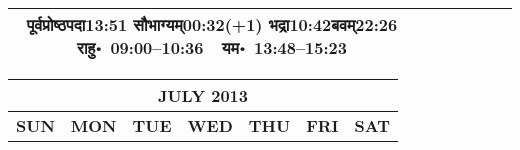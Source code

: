 \documentclass[a3paper,12pt,landscape]{article}
\newcommand{\To}{\hspace{1pt}\raisebox{0pt}{\tiny\RIGHTarrow}\hspace{1pt}}
\newcommand{\rahuyama}[2]{%
{राहु॰~\textsf{#1}~~यम॰~\textsf{#2}}
}
\begin{document}
\begin{center}
\begin{tabular}{|c|c|c|c|c|c|c|}
{{\mbox{पूर्वप्रोष्ठपदा\To{}\textsf{13:51\hspace{2ex}}}}%
{\mbox{सौभाग्यम्\To{}\textsf{00:32(+1)\hspace{2ex}}}}%
{\mbox{भद्रा\To{}\textsf{10:42\hspace{2ex}}}\mbox{बवम्\To{}\textsf{22:26\hspace{2ex}}}}}%
{\rahuyama{09:00--10:36}{13:48--15:23}}%
{}
\\ \hline %
\end{tabular}



\begin{tabular}{|c|c|c|c|c|c|c|}
\multicolumn{7}{c}{\Large \bfseries \sffamily JULY 2013}\\[3mm]
\hline
\textbf{\textsf{SUN}} & \textbf{\textsf{MON}} & \textbf{\textsf{TUE}} & \textbf{\textsf{WED}} & \textbf{\textsf{THU}} & \textbf{\textsf{FRI}} & \textbf{\textsf{SAT}} \\ \hline


\end{tabular}
\end{center}
\end{document}
